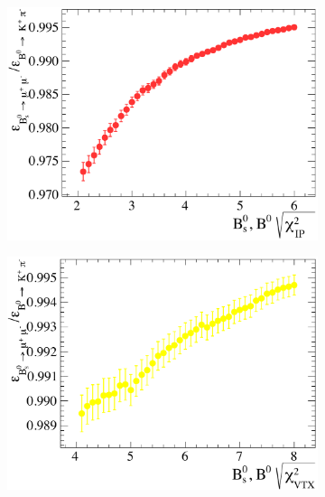 \begin{figure}[p]
  \centering
  \begin{subfigure}[b]{0.48\textwidth}
    \includegraphics[width=\textwidth]{./Figs/Selection/Bd2KPi_IP.pdf}
    \caption{}
    \label{fig:KPiIP}   
  \end{subfigure}             
  \begin{subfigure}[b]{0.48\textwidth}
    \includegraphics[width=\textwidth]{./Figs/Selection/Bd2KPi_VTX.pdf}
    \caption{}
    \label{fig:KPivertex}
  \end{subfigure}             
  \begin{subfigure}[b]{0.48\textwidth}

\end{subfigure}
\end{figure}
